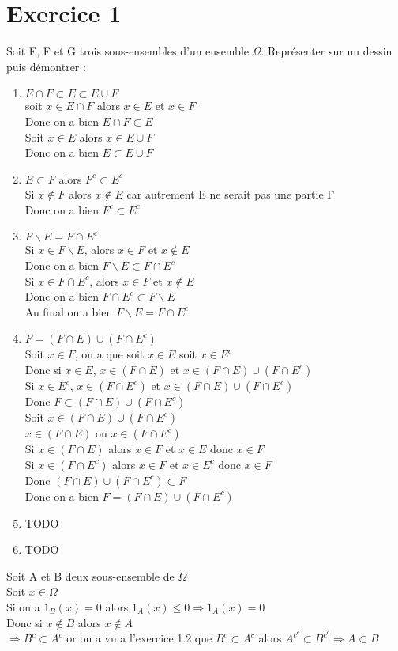 \documentclass{article}
\author{Frederic Becerril}
\begin{document}
\part*{Exercice 1}

Soit E, F et G trois sous-ensembles d'un ensemble $\Omega$. Représenter sur un dessin puis démontrer :
\begin{enumerate}
    \item $E \cap F \subset E \subset E \cup F$\\
soit $x \in E \cap F$ alors $x \in E$ et $x \in F$\\
Donc on a bien $E \cap F \subset E$\\
Soit $x \in E$ alors $x \in E \cup F$\\
Donc on a bien $E \subset E \cup F$
    \item $E \subset F$ alors $F^c \subset E^c$\\
Si $x \notin F$ alors $x \notin E$ car autrement E ne serait pas une partie F\\
Donc on a bien $F^c \subset E^c$
    \item $F \backslash E = F \cap E^c$\\
Si $x \in F \backslash E$, alors $x \in F$ et $x \notin E$\\
Donc on a bien $F \backslash E \subset F \cap E^c$\\
Si $x \in F \cap E^c$, alors $x \in F$ et $x \notin E$\\
Donc on a bien $F \cap E^c \subset F \backslash E$\\
Au final on a bien $F \backslash E = F \cap E^c$
    \item $F = (F \cap E) \cup (F \cap E^c)$\\
Soit $x \in F$, on a que soit $x \in E$ soit $x \in E^c$\\
Donc si $x \in E$, $x \in (F \cap E)$ et $x \in (F \cap E) \cup (F \cap E^c)$\\
Si $x \in E^c$, $x \in (F \cap E^c)$ et $x \in (F \cap E) \cup (F \cap E^c)$\\
Donc $F \subset (F \cap E) \cup (F \cap E^c)$\\
Soit $x \in (F \cap E) \cup (F \cap E^c)$\\
$x \in (F \cap E)$ ou $x \in (F \cap E^c)$\\
Si $x \in (F \cap E)$ alors $x \in F$ et $x \in E$ donc $x \in F$\\
Si $x \in (F \cap E^c)$ alors $x \in F$ et $x \in E^c$ donc $x \in F$\\
Donc $(F \cap E) \cup (F \cap E^c) \subset F$\\
Donc on a bien $F = (F \cap E) \cup (F \cap E^c)$
    \item TODO
    \item TODO
\end{enumerate}
Soit A et B deux sous-ensemble de $\Omega$\\
Soit $x \in \Omega$\\
Si on a $1_B(x) = 0$ alors $1_A(x) \leq 0 \Rightarrow 1_A(x) = 0$\\
Donc si $x \notin B$ alors $x \notin A$\\
$\Rightarrow B^c \subset A^c$ or on a vu a l'exercice 1.2 que $B^c \subset A^c$ alors $A^{c^c} \subset B^{c^c} \Rightarrow A \subset B$ 
\end{document}
